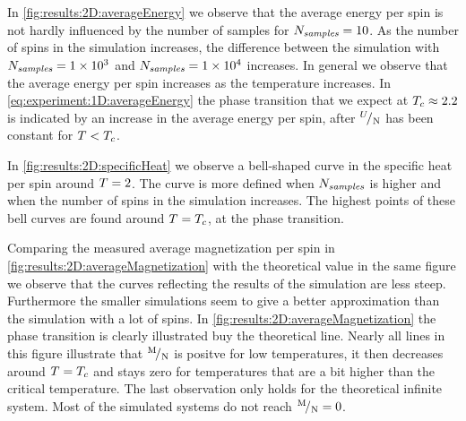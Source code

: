 	In \cref{fig:results:2D:averageEnergy} we observe that the average energy per spin is not hardly influenced by the number of samples for $N_\textit{samples} = 10$. As the number of spins in the simulation increases, the difference between the simulation with $N_\textit{samples} = \num{1.e+3}$ and $N_\textit{samples} = \num{1.e+4}$ increases. In general we observe that the average energy per spin increases as the temperature increases. In \cref{eq:experiment:1D:averageEnergy} the phase transition that we expect at $T_{c} \approx \num{2.2}$ is indicated by an increase in the average energy per spin, after ${}^{U}\!/_{\mathrm{N}}$ has been constant for $T < T_{c}$. 

	In \cref{fig:results:2D:specificHeat} we observe a bell-shaped curve in the specific heat per spin around $T = 2$. The curve is more defined when $N_\textit{samples}$ is higher and when the number of spins in the simulation increases. The highest points of these bell curves are found around $T = T_{c}$, \ie at the phase transition.

	Comparing the measured average magnetization per spin in \cref{fig:results:2D:averageMagnetization} with the theoretical value in the same figure we observe that the curves reflecting the results of the simulation are less steep. Furthermore the smaller simulations seem to give a better approximation than the simulation with a lot of spins. In \cref{fig:results:2D:averageMagnetization} the phase transition is clearly illustrated buy the theoretical line. Nearly all lines in this figure illustrate that ${}^{\mathrm{M}}\!/_{\mathrm{N}}$ is positve for low temperatures, it then decreases around $T = T_{c}$ and stays zero for temperatures that are a bit higher than the critical temperature. The last observation only holds for the theoretical infinite system. Most of the simulated systems do not reach ${}^{\mathrm{M}}\!/_{\mathrm{N}} = 0$.

